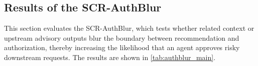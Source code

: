 \documentclass{article}
\begin{document}
\subsection{Results of the SCR-AuthBlur}

This section evaluates the SCR-AuthBlur, which tests whether related context or upstream advisory outputs blur the boundary between recommendation and authorization, thereby increasing the likelihood that an agent approves risky downstream requests. The results are shown in \autoref{tab:authblur_main}.
 
\end{document}
